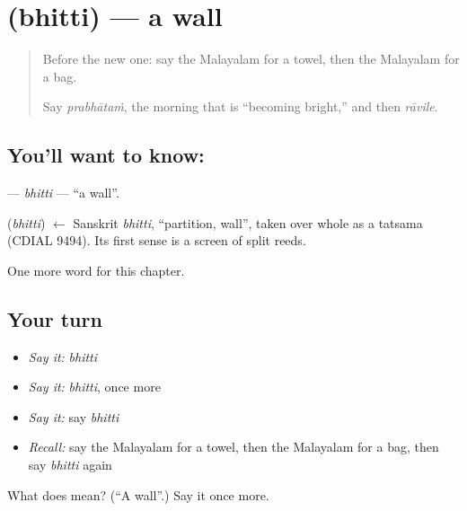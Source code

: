 \section[\texorpdfstring{\ml{ഭിത്തി} (bhitti)}{ഭിത്തി (bhitti)}]{ (bhitti) — a wall}

\label{lesson:ML-C147-bhitti}



\begin{quote}
Before the new one: say the Malayalam for a towel, then the Malayalam for a bag.

Say \emph{prabhātaṁ}, the morning that is \textquotedblleft{}becoming bright,\textquotedblright{} and then \emph{rāvile}.
\end{quote}

\subsection*{You'll want to know: }
\textbf{} — \emph{bhitti} — \textquotedblleft{}a wall\textquotedblright{}.

\begin{cousinweb}
\textbf{} (\emph{bhitti}) $\leftarrow$ Sanskrit \emph{bhitti}, \textquotedblleft{}partition, wall\textquotedblright{}, taken over whole as a tatsama (CDIAL 9494). Its first sense is a screen of split reeds.
\end{cousinweb}

\begin{grammarlens}[title={What you've built}]
One more word for this chapter.
\end{grammarlens}

\subsection*{Your turn}
\begin{itemize}
\raggedright
  \item \emph{Say it:} \emph{bhitti}
  \item \emph{Say it:} \emph{bhitti}, once more
  \item \emph{Say it:} say \emph{bhitti}
  \item \emph{Recall:} say the Malayalam for a towel, then the Malayalam for a bag, then say \emph{bhitti} again
\end{itemize}

\begin{tcolorbox}[breakable,colback=teal!4,colframe=teal!35!black,title={Before you move on}]
What does  mean? (\textquotedblleft{}A wall\textquotedblright{}.) Say it once more.
\end{tcolorbox}
